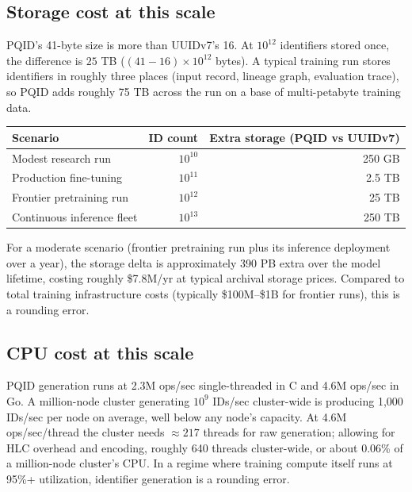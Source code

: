 \subsection{Storage cost at this scale}

PQID's 41-byte size is more than UUIDv7's 16. At $10^{12}$ identifiers stored once, the difference is $25$ TB ($(41-16) \times 10^{12}$ bytes). A typical training run stores identifiers in roughly three places (input record, lineage graph, evaluation trace), so PQID adds roughly 75 TB across the run on a base of multi-petabyte training data.

\begin{center}
\renewcommand{\arraystretch}{1.15}
\begin{tabular}{lrr}
\toprule
\textbf{Scenario} & \textbf{ID count} & \textbf{Extra storage (PQID vs UUIDv7)} \\
\midrule
Modest research run         & $10^{10}$ & 250 GB \\
Production fine-tuning      & $10^{11}$ & 2.5 TB  \\
Frontier pretraining run    & $10^{12}$ & 25 TB   \\
Continuous inference fleet  & $10^{13}$ & 250 TB  \\
\bottomrule
\end{tabular}
\end{center}

For a moderate scenario (frontier pretraining run plus its inference deployment over a year), the storage delta is approximately 390 PB extra over the model lifetime, costing roughly \$7.8M/yr at typical archival storage prices. Compared to total training infrastructure costs (typically \$100M--\$1B for frontier runs), this is a rounding error.

\subsection{CPU cost at this scale}

PQID generation runs at 2.3M ops/sec single-threaded in C and 4.6M ops/sec in Go. A million-node cluster generating $10^9$ IDs/sec cluster-wide is producing 1{,}000 IDs/sec per node on average, well below any node's capacity. At 4.6M ops/sec/thread the cluster needs $\approx 217$ threads for raw generation; allowing for HLC overhead and encoding, roughly 640 threads cluster-wide, or about 0.06\% of a million-node cluster's CPU. In a regime where training compute itself runs at 95\%+ utilization, identifier generation is a rounding error.

